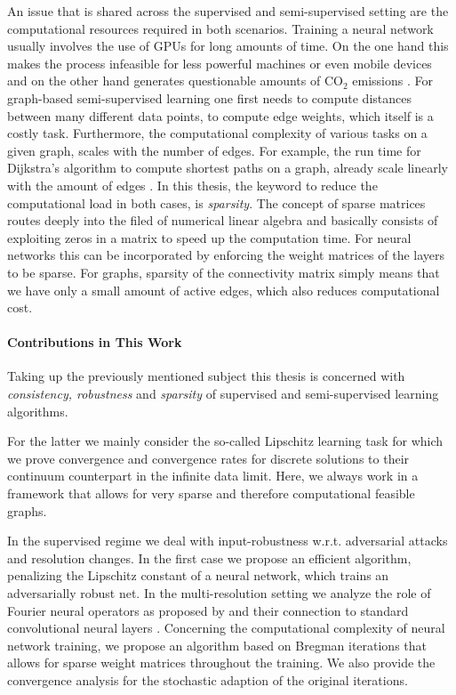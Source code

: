 An issue that is shared across the supervised and semi-supervised setting are the computational resources required in both scenarios. Training a neural network usually involves the use of GPUs for long amounts of time. On the one hand this makes the process infeasible for less powerful machines or even mobile devices and on the other hand generates questionable amounts of $\mathrm{CO_2}$ emissions \cite{hoefler2021sparsity}. For graph-based semi-supervised learning one first needs to compute distances between many different data points, to compute edge weights, which itself is a costly task. Furthermore, the computational complexity of various tasks on a given graph, scales with the number of edges. For example, the run time for Dijkstra's algorithm to compute shortest paths on a graph, already scale linearly with the amount of edges \cite{dijkstra2022note}. In this thesis, the keyword to reduce the computational load in both cases, is \textit{sparsity}. The concept of sparse matrices routes deeply into the filed of numerical linear algebra \cite{lanczos1952solution,golub2013matrix} and basically consists of exploiting zeros in a matrix to speed up the computation time. For neural networks this can be incorporated by enforcing the weight matrices of the layers to be sparse. For graphs, sparsity of the connectivity matrix simply means that we have only a small amount of active edges, which also reduces computational cost.
%
%
\paragraph{Contributions in This Work}
%
Taking up the previously mentioned subject this thesis is concerned with \textit{consistency, robustness} and \textit{sparsity} of supervised and semi-supervised learning algorithms. 

For the latter we mainly consider the so-called Lipschitz learning task \cite{nadler2009statistical} for which we prove convergence and convergence rates for discrete solutions to their continuum counterpart in the infinite data limit. Here, we always work in a framework that allows for very sparse and therefore computational feasible graphs.

In the supervised regime we deal with input-robustness w.r.t. adversarial attacks and resolution changes. In the first case we propose an efficient algorithm, penalizing the Lipschitz constant \cite{lipschitz1877lehrbuch} of a neural network, which trains an adversarially robust net. In the multi-resolution setting we analyze the role of Fourier neural operators as proposed by \cite{li2020fourier} and their connection to standard convolutional neural layers \cite{fukushima1980neocognitron}. Concerning the computational complexity of neural network training, we propose an algorithm based on Bregman iterations \cite{osher2005iterative} that allows for sparse weight matrices throughout the training. We also provide the convergence analysis for the stochastic adaption of the original iterations.


